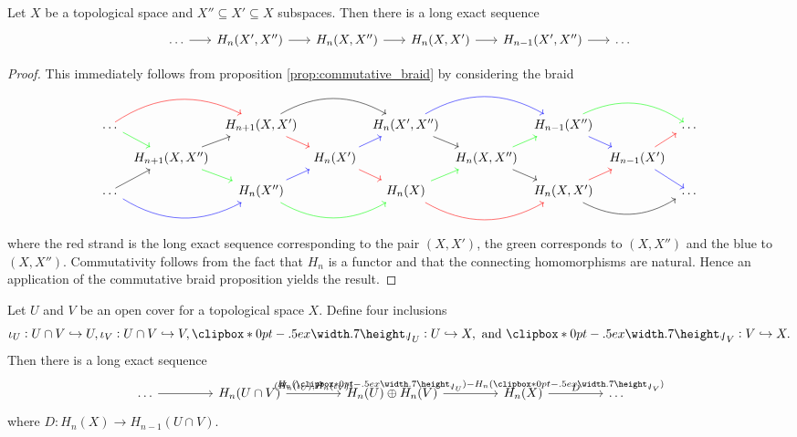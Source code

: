 \begin{proposition}
	Let $X$ be a topological space and $X'' \subseteq X' \subseteq X$ subspaces. Then there is a long exact sequence
	\begin{equation*}
		\begin{tikzcd}[column sep=4ex]
			\dots \arrow[r] & H_n(X',X'') \arrow[r] & H_n(X,X'') \arrow[r] & H_n(X,X')\arrow[r] & H_{n - 1}(X',X'') \arrow[r] & \dots
		\end{tikzcd}
	\end{equation*}
\end{proposition}

\begin{proof}
	This immediately follows from proposition \ref{prop:commutative_braid} by considering the braid
	\begin{equation*}
		\begin{tikzcd}[column sep=1ex, row sep=2ex]
			\dots \arrow[dr,green]\arrow[rr,red, bend left] & & H_{n + 1}(X,X')\arrow[rr,bend left]\arrow[dr,red] & & H_n(X',X'') \arrow[rr,blue,bend left]\arrow[dr] & & H_{n - 1}(X'')\arrow[rr,green,bend left]\arrow[dr,blue] & & \dots\\
			& H_{n + 1}(X,X'') \arrow[ur]\arrow[dr,green] & & H_n(X') \arrow[dr,red]\arrow[ur,blue] & & H_n(X,X'') \arrow[dr]\arrow[ur,green] & & H_{n - 1}(X')\arrow[dr,blue]\arrow[ur,red]\\
			\dots \arrow[ur]\arrow[rr,blue,bend right] & & H_n(X'') \arrow[ur,blue]\arrow[rr,bend right, green] & & H_n(X) \arrow[rr,bend right,red]\arrow[ur,green] & & H_n(X,X') \arrow[rr,bend right]\arrow[ur,red] & & \dots
		\end{tikzcd}
	\end{equation*}
	\noindent where the red strand is the long exact sequence corresponding to the pair $(X,X')$, the green corresponds to $(X,X'')$ and the blue to $(X,X'')$. Commutativity follows from the fact that $H_n$ is a functor and that the connecting homomorphisms are natural. Hence an application of the commutative braid proposition yields the result.
\end{proof}

\begin{theorem}
	\label{thm:Mayer_Vietoris}
	Let $U$ and $V$ be an open cover for a topological space $X$. Define four inclusions 
	\begin{equation*}
		\iota_U : U \cap V \hookrightarrow U, \iota_V : U \cap V \hookrightarrow V, \jota_U : U \hookrightarrow X, \text{ and } \jota_V : V \hookrightarrow X.
	\end{equation*}
	Then there is a long exact sequence
	\begin{equation*}
		\begin{tikzcd}[column sep=10ex]
			\dots \arrow[r] & H_n(U \cap V) \arrow[r,"{(H_n(\iota_U),H_n(\iota_V))}"] & H_n(U) \oplus H_n(V) \arrow[r,"{H_n(\jota_U)-H_n(\jota_V)}"] & H_n(X) \arrow[r,"D"] & \dots
		\end{tikzcd}
	\end{equation*}
	\noindent where $D : H_n(X) \to H_{n - 1}(U \cap V)$.
\end{theorem}

